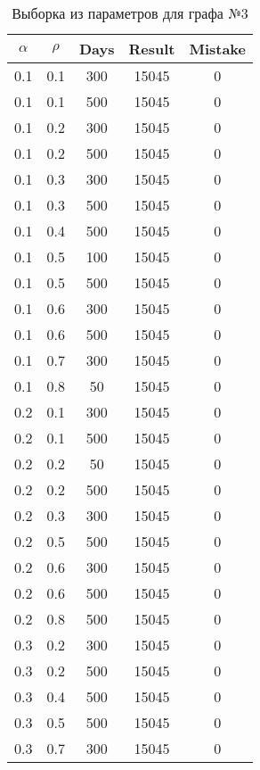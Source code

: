 \begin{table}[ht]
	\small
	\begin{center}
		\begin{threeparttable}
			\caption{Выборка из параметров для графа №3}
			\label{tbl:table_graph3_part1}
			\begin{tabular}{|c|c|c|c|c|}
				\hline
				$\alpha$ & $\rho$ & Days & Result & Mistake \\ 
				\hline
				0.1 &  0.1 &  300 & 15045 &     0 \\
				0.1 &  0.1 &  500 & 15045 &     0 \\
				0.1 &  0.2 &  300 & 15045 &     0 \\
				0.1 &  0.2 &  500 & 15045 &     0 \\
				0.1 &  0.3 &  300 & 15045 &     0 \\
				0.1 &  0.3 &  500 & 15045 &     0 \\
				0.1 &  0.4 &  500 & 15045 &     0 \\
				0.1 &  0.5 &  100 & 15045 &     0 \\
				0.1 &  0.5 &  500 & 15045 &     0 \\
				0.1 &  0.6 &  300 & 15045 &     0 \\
				0.1 &  0.6 &  500 & 15045 &     0 \\
				0.1 &  0.7 &  300 & 15045 &     0 \\
				0.1 &  0.8 &   50 & 15045 &     0 \\ \hline
				0.2 &  0.1 &  300 & 15045 &     0 \\
				0.2 &  0.1 &  500 & 15045 &     0 \\
				0.2 &  0.2 &   50 & 15045 &     0 \\
				0.2 &  0.2 &  500 & 15045 &     0 \\
				0.2 &  0.3 &  300 & 15045 &     0 \\
				0.2 &  0.5 &  500 & 15045 &     0 \\
				0.2 &  0.6 &  300 & 15045 &     0 \\
				0.2 &  0.6 &  500 & 15045 &     0 \\
				0.2 &  0.8 &  500 & 15045 &     0 \\ \hline
				0.3 &  0.2 &  300 & 15045 &     0 \\
				0.3 &  0.2 &  500 & 15045 &     0 \\
				0.3 &  0.4 &  500 & 15045 &     0 \\
				0.3 &  0.5 &  500 & 15045 &     0 \\
				0.3 &  0.7 &  300 & 15045 &     0 \\

\end{tabular}
\end{threeparttable}
\end{center}
\end{table}
